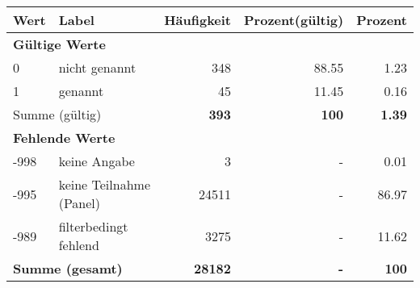      \begin{longtable}{lXrrr}
     \toprule
     \textbf{Wert} & \textbf{Label} & \textbf{Häufigkeit} & \textbf{Prozent(gültig)} & \textbf{Prozent} \\
     \endhead
     \midrule
     \multicolumn{5}{l}{\textbf{Gültige Werte}}\\

     0 &
     \multicolumn{1}{X}{ nicht genannt   } &


       \num{348} &
       \num[round-mode=places,round-precision=2]{88,55} &
         \num[round-mode=places,round-precision=2]{1,23} \\

     1 &
     \multicolumn{1}{X}{ genannt   } &


       \num{45} &
       \num[round-mode=places,round-precision=2]{11,45} &
         \num[round-mode=places,round-precision=2]{0,16} \\
     \midrule
     \multicolumn{2}{l}{Summe (gültig)} &
       \textbf{\num{393}} &
     \textbf{100} &
       \textbf{\num[round-mode=places,round-precision=2]{1,39}} \\
     \multicolumn{5}{l}{\textbf{Fehlende Werte}}\\
       -998 &
       keine Angabe &
         \num{3} &
        - &
         \num[round-mode=places,round-precision=2]{0,01} \\
       -995 &
       keine Teilnahme (Panel) &
         \num{24511} &
        - &
         \num[round-mode=places,round-precision=2]{86,97} \\
       -989 &
       filterbedingt fehlend &
         \num{3275} &
        - &
         \num[round-mode=places,round-precision=2]{11,62} \\
     \midrule
     \multicolumn{2}{l}{\textbf{Summe (gesamt)}} &
          \textbf{\num{28182}} &
        \textbf{-} &
        \textbf{100} \\
     \bottomrule
     \end{longtable}
     
